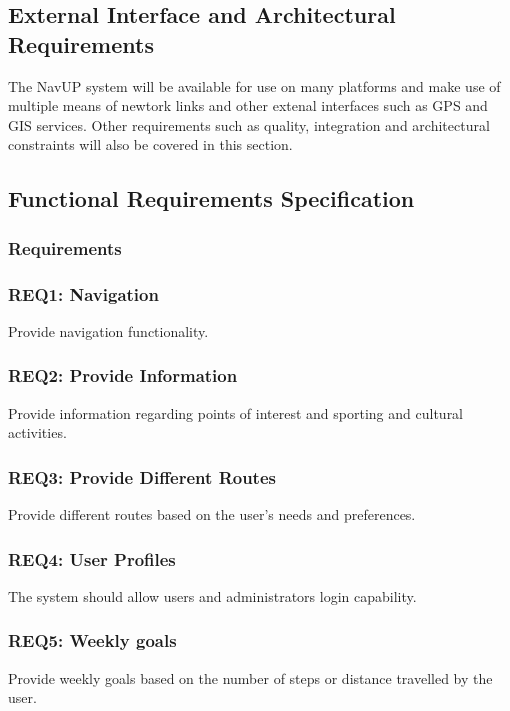 \documentclass[11pt, a4paper]{article}
\begin{document}
	\subsection{External Interface and Architectural Requirements}
		
		The NavUP system will be available for use on many platforms and make use of multiple means of newtork links and other extenal interfaces such as GPS and GIS services.
		Other requirements such as quality,  integration and architectural constraints will also be covered in this section.
		
	\subsection{Functional Requirements Specification}
	\subsubsection{Requirements}
		
		\subsubsection {REQ1: Navigation}
			Provide navigation functionality.
			
		\subsubsection {REQ2: Provide Information}
			Provide information regarding points of interest and sporting and cultural activities.
			
		\subsubsection{REQ3: Provide Different Routes}
			Provide different routes based on the user's needs and preferences.
		
		\subsubsection{REQ4: User Profiles}
			The system should allow users and administrators login capability.
			
		\subsubsection{REQ5: Weekly goals}
			Provide weekly goals based on the number of steps or distance travelled by the user.
			
\end{document}
